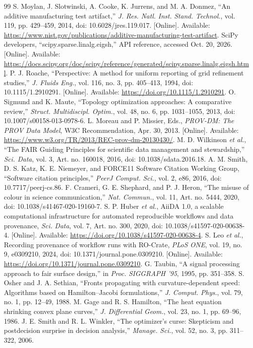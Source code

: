 \begin{thebibliography}{99}
 S. Moylan, J. Slotwinski, A. Cooke, K. Jurrens, and M. A. Donmez, ``An additive manufacturing test artifact,'' \emph{J. Res. Natl. Inst. Stand. Technol.}, vol. 119, pp. 429--459, 2014, doi: 10.6028/jres.119.017. [Online]. Available: \url{https://www.nist.gov/publications/additive-manufacturing-test-artifact}.
 SciPy developers, ``scipy.sparse.linalg.eigsh,'' API reference, accessed Oct. 20, 2026. [Online]. Available: \url{https://docs.scipy.org/doc/scipy/reference/generated/scipy.sparse.linalg.eigsh.html}.
 P. J. Roache, ``Perspective: A method for uniform reporting of grid refinement studies,'' \emph{J. Fluids Eng.}, vol. 116, no. 3, pp. 405--413, 1994, doi: 10.1115/1.2910291. [Online]. Available: \url{https://doi.org/10.1115/1.2910291}.
 O. Sigmund and K. Maute, ``Topology optimization approaches: A comparative review,'' \emph{Struct. Multidiscipl. Optim.}, vol. 48, no. 6, pp. 1031--1055, 2013, doi: 10.1007/s00158-013-0978-6.
 L. Moreau and P. Missier, Eds., \emph{PROV-DM: The PROV Data Model}, W3C Recommendation, Apr. 30, 2013. [Online]. Available: \url{https://www.w3.org/TR/2013/REC-prov-dm-20130430/}.
 M. D. Wilkinson \emph{et al.}, ``The FAIR Guiding Principles for scientific data management and stewardship,'' \emph{Sci. Data}, vol. 3, Art. no. 160018, 2016, doi: 10.1038/sdata.2016.18.
 A. M. Smith, D. S. Katz, K. E. Niemeyer, and FORCE11 Software Citation Working Group, ``Software citation principles,'' \emph{PeerJ Comput. Sci.}, vol. 2, e86, 2016, doi: 10.7717/peerj-cs.86.
 F. Crameri, G. E. Shephard, and P. J. Heron, ``The misuse of colour in science communication,'' \emph{Nat. Commun.}, vol. 11, Art. no. 5444, 2020, doi: 10.1038/s41467-020-19160-7.
 S. P. Huber \emph{et al.}, AiiDA 1.0, a scalable computational infrastructure for automated reproducible workflows and data provenance, \emph{Sci. Data}, vol. 7, Art. no. 300, 2020, doi: 10.1038/s41597-020-00638-4. [Online]. Available: \url{https://doi.org/10.1038/s41597-020-00638-4}.
 S. Leo \emph{et al.}, Recording provenance of workflow runs with RO-Crate, \emph{PLoS ONE}, vol. 19, no. 9, e0309210, 2024, doi: 10.1371/journal.pone.0309210. [Online]. Available: \url{https://doi.org/10.1371/journal.pone.0309210}.
 G. Taubin, ``A signal processing approach to fair surface design,'' in \emph{Proc. SIGGRAPH '95}, 1995, pp. 351--358.
 S. Osher and J. A. Sethian, ``Fronts propagating with curvature-dependent speed: Algorithms based on Hamilton--Jacobi formulations,'' \emph{J. Comput. Phys.}, vol. 79, no. 1, pp. 12--49, 1988.
 M. Gage and R. S. Hamilton, ``The heat equation shrinking convex plane curves,'' \emph{J. Differential Geom.}, vol. 23, no. 1, pp. 69--96, 1986.
 J. E. Smith and R. L. Winkler, ``The optimizer's curse: Skepticism and postdecision surprise in decision analysis,'' \emph{Manage. Sci.}, vol. 52, no. 3, pp. 311--322, 2006.
\end{thebibliography}
